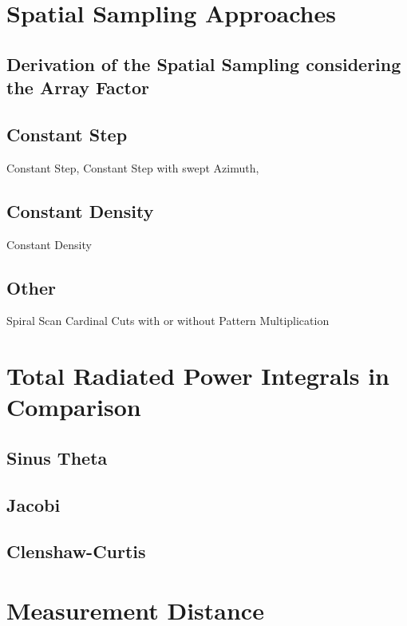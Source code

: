 \section{Spatial Sampling Approaches}

\subsection{Derivation of the Spatial Sampling considering the Array Factor}

\subsection{Constant Step}
Constant Step, Constant Step with swept Azimuth,

\subsection{Constant Density}

Constant Density

\subsection{Other}

Spiral Scan
Cardinal Cuts with or without Pattern Multiplication

\section{Total Radiated Power Integrals in Comparison}

\subsection{Sinus Theta}

\subsection{Jacobi}

\subsection{Clenshaw-Curtis}

\section{Measurement Distance}